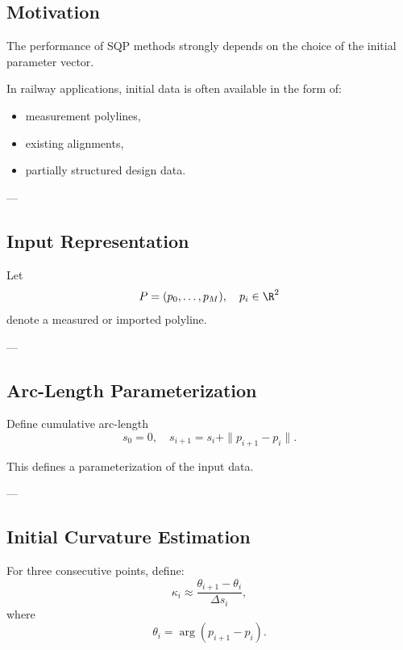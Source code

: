 \subsection{Motivation}

\begin{remark}
The performance of SQP methods strongly depends on the choice of the
initial parameter vector.
\end{remark}

\begin{remark}
In railway applications, initial data is often available in the form of:
\begin{itemize}
\item measurement polylines,
\item existing alignments,
\item partially structured design data.
\end{itemize}
\end{remark}

---

\subsection{Input Representation}

\begin{definition}
Let
\[
P = (p_0,\dots,p_M), \quad p_i \in \R^2
\]
denote a measured or imported polyline.
\end{definition}

---

\subsection{Arc-Length Parameterization}

\begin{definition}
Define cumulative arc-length
\[
s_0 = 0,
\quad
s_{i+1} = s_i + \|p_{i+1} - p_i\|.
\]
\end{definition}

\begin{remark}
This defines a parameterization of the input data.
\end{remark}

---

\subsection{Initial Curvature Estimation}

\begin{definition}
For three consecutive points, define:
\[
\kappa_i
\approx
\frac{\theta_{i+1} - \theta_i}{\Delta s_i},
\]
where
\[
\theta_i = \arg(p_{i+1} - p_i).
\]
\end{definition}

